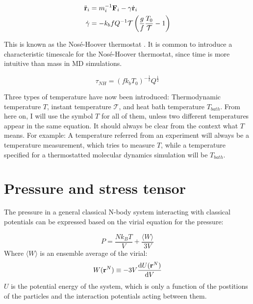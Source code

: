 \begin{align}
	\ddot {\mathbf{r}}_i & = m_i^{-1} \mathbf{F}_i -\gamma \dot{\mathbf{r}}_i \\
	\dot \gamma & = -k_b f Q^{-1} \mathcal{T} \left(\frac{g}{f} \frac{T_0}{\mathcal{T}}-1\right)
\end{align}

This is known as the Nosé-Hoover thermostat \cite{PhysRevA.31.1695}. It is common to introduce a characteristic timescale for the Nosé-Hoover thermostat, since time is more intuitive than mass in MD simulations. 

\begin{equation}
	\tau_{NH} = (fk_b T_0)^{-\frac{1}{2}} Q^{\frac{1}{2}}
\end{equation}

Three types of temperature have now been introduced: Thermodynamic temperature $T$, instant temperature $\mathcal{T}$, and heat bath temperature $T_{bath}$. From here on, I will use the symbol $T$ for all of them, unless two different temperatures appear in the same equation. It should always be clear from the context what $T$ means. For example: A temperature referred from an experiment will always be a temperature measurement, which tries to measure $T$, while a temperature specified for a thermostatted molecular dynamics simulation will be $T_{bath}$.

\section{Pressure and stress tensor}
The pressure in a general classical N-body system interacting with classical potentials can be expressed based on the virial equation for the pressure:

\begin{equation}
	P = \frac{Nk_BT}{V} + \frac{\langle W \rangle}{3V}
\end{equation}
Where $\langle W \rangle$ is an ensemble average of the virial:
\begin{equation}
	W(\mathbf{r}^N) \equiv -3V\frac{\mathrm{d} U(\mathbf{r}^N)}{\mathrm{d} V}
\end{equation}
$U$ is the potential energy of the system, which is only a function of the postitions of the particles and the interaction potentials acting between them. 

